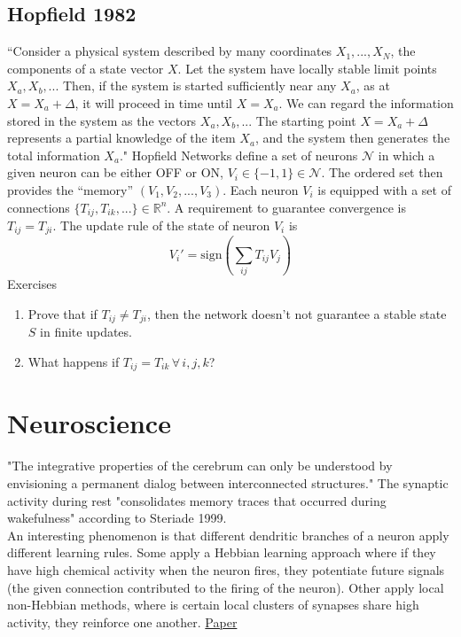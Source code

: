 \documentclass{article}
\begin{document}
\subsection{Hopfield 1982}
``Consider a physical system described by many coordinates $X_1,..., X_N$, the components of a state vector $X$. Let the system have locally stable limit points $X_a, X_b, ...$ Then, if the system is started sufficiently near any $X_a$, as at $X = X_a + \Delta$, it will proceed in time until $X = X_a$. We can regard the information stored in the system as the vectors $X_a, X_b, ...$ The starting point $X = X_a + \Delta$ represents a partial knowledge of the item $X_a$, and the system then generates the total information $X_a$." Hopfield Networks define a set of neurons $\mathcal{N}$ in which a given neuron can be either OFF or ON, $V_i \in \{-1,1\} \in \mathcal{N}$. The ordered set then provides the ``memory'' $(V_1,V_2, ..., V_3)$. Each neuron $V_i$ is equipped with a set of connections $\{T_{ij}, T_{ik},...\} \in \mathbb{R}^n$. A requirement to guarantee convergence is $T_{ij} = T_{ji}$. The update rule of the state of neuron $V_i$ is
\begin{equation}
    V_i' = \mathrm{sign}\left( \sum_{ij}T_{ij}V_j \right)
\end{equation}
Exercises
\begin{enumerate}
    \item Prove that if $T_{ij} \ne T_{ji}$, then the network doesn't not guarantee a stable state $S$ in finite updates.
    \item What happens if $T_{ij} = T_{ik} \, \forall \, i,j,k$?
\end{enumerate}


\section{Neuroscience}
"The integrative properties of the cerebrum can only
be understood by envisioning a permanent dialog
between interconnected structures." The synaptic activity during rest "consolidates memory traces that occurred during wakefulness" according to Steriade 1999. \\

An interesting phenomenon is that different dendritic branches of a neuron apply different learning rules. Some apply a Hebbian learning approach where if they have high chemical activity when the neuron fires, they potentiate future signals (the given connection contributed to the firing of the neuron). Other apply local non-Hebbian methods, where is certain local clusters of synapses share high activity, they reinforce one another. \href{https://www.science.org/doi/10.1126/science.ads4706}{Paper}
\end{document}
